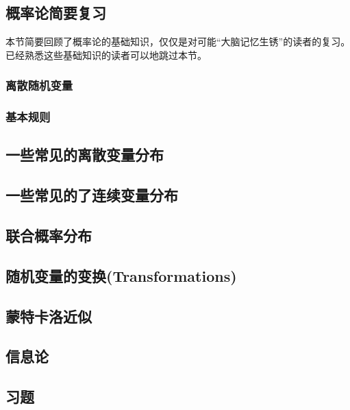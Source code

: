 \documentclass{article}
\begin{document}
  \subsection{概率论简要复习}
  本节简要回顾了概率论的基础知识，仅仅是对可能“大脑记忆生锈”的读者的复习。 
  已经熟悉这些基础知识的读者可以地跳过本节。
  \subsubsection{离散随机变量}
  \subsubsection{基本规则}
  \subsection{一些常见的离散变量分布}
  \subsection{一些常见的了连续变量分布}
  \subsection{联合概率分布}
  \subsection{随机变量的变换(Transformations)}
  \subsection{蒙特卡洛近似}
  \subsection{信息论}
  \subsection*{习题}
\end{document}
